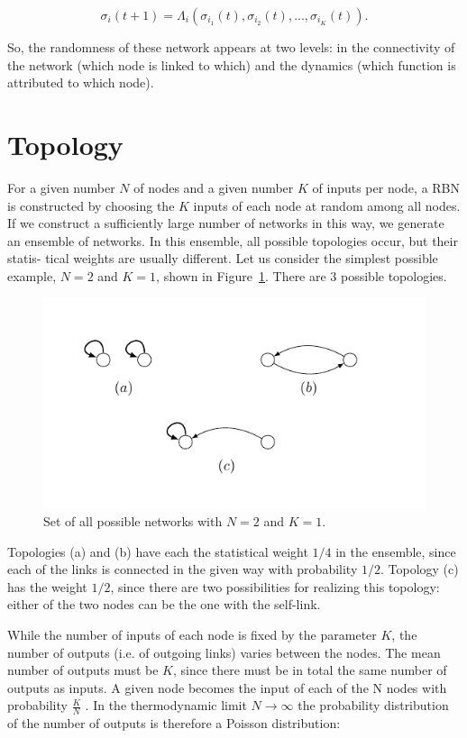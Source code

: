 \begin{equation}
\sigma_i(t+1)=\Lambda_i(\sigma_{i_1}(t),\sigma_{i_2}(t), ...,\sigma_{i_K}(t)).
\end{equation}  

So, the randomness of these network appears at two levels: in the connectivity of the network (which node is linked
to which) and the dynamics (which function is attributed to which node).

\section{Topology}
For a given number $N$ of nodes and a given number
$K$ of inputs per node, a RBN is constructed by choosing
the $K$ inputs of each node at random among all nodes.
If we construct a sufficiently large number of networks in
this way, we generate an ensemble of networks. In this
ensemble, all possible topologies occur, but their statis-
tical weights are usually different. Let us consider the
simplest possible example, $N = 2$ and $K = 1$, shown
in Figure~\ref{fig:rb}. There are 3 possible topologies.



\begin{figure}[h]
\centering
\includegraphics[scale=1]{figurenetworks.pdf}
\caption{Set of all possible networks with $N=2$ and $K=1$.}
\label{fig:rb}
\end{figure}

Topologies (a) and (b) have each the statistical weight $1/4$ in
the ensemble, since each of the links is connected in the
given way with probability $1/2$. Topology (c) has the
weight $1/2$, since there are two possibilities for realizing
this topology: either of the two nodes can be the one
with the self-link.


While the number of inputs of each node is fixed by
the parameter $K$, the number of outputs (i.e. of outgoing links) varies between the nodes. The mean number of
outputs must be $K$, since there must be in total the same
number of outputs as inputs. A given node becomes the
input of each of the N nodes with probability $\frac{K}{N}$ . In
the thermodynamic limit $N \to \infty$ the probability distribution of the number of outputs is therefore a Poisson
distribution:

